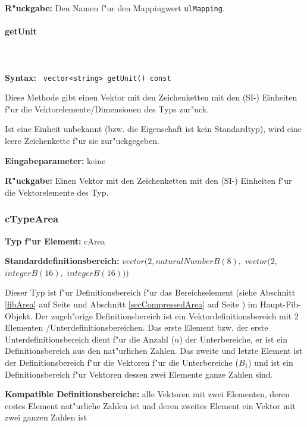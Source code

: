 \bigskip\noindent
\textbf{R"uckgabe:} Den Namen f"ur den Mappingwert \verb|ulMapping|.


\paragraph{getUnit}

\ \\\\\noindent
\textbf{Syntax:} \verb| vector<string> getUnit() const|

\bigskip\noindent
Diese Methode gibt einen Vektor mit den Zeichenketten mit den (SI-) Einheiten f"ur die Vektorelemente/Dimensionen des Typs zur"uck.

Ist eine Einheit unbekannt (bzw. die Eigenschaft ist kein Standardtyp), wird eine leere Zeichenkette f"ur sie zur"uckgegeben.

\bigskip\noindent
\textbf{Eingabeparameter:} keine

\bigskip\noindent
\textbf{R"uckgabe:} Einen Vektor mit den Zeichenketten mit den (SI-) Einheiten f"ur die Vektorelemente des Typ.



\subsubsection{cTypeArea}

\textbf{Typ f"ur Element:} cArea%

\bigskip\noindent
\textbf{Standarddefinitionsbereich:} $vector( 2, naturalNumberB(8),$ $vector( 2,$ $integerB(16),$ $integerB(16) ) )$


Dieser Typ ist f"ur Definitionsbereich f"ur das Bereichselement (siehe Abschnitt \ref{fibArea} auf Seite \pageref{fibArea} und Abschnitt \ref{secCompressedArea} auf Seite \pageref{secCompressedArea}) im Haupt-Fib-Objekt. Der zugeh"orige Definitionsbereich ist ein Vektordefinitionsbereich mit 2 Elementen /Unterdefinitionsbereichen. Das erste Element bzw. der erste Unterdefinitionsbereich dient f"ur die Anzahl ($n$) der Unterbereiche, er ist ein Definitionsbereich aus den nat"urlichen Zahlen. Das zweite und letzte Element ist der Definitionsbereich f"ur die Vektoren f"ur die Unterbereiche ($B_{1}$) und ist ein Definitionsbereich f"ur Vektoren dessen zwei Elemente ganze Zahlen sind. 

\bigskip\noindent
\textbf{Kompatible Definitionsbereiche:} alle Vektoren mit zwei Elementen, deren erstes Element nat"urliche Zahlen ist und deren zweites Element ein Vektor mit zwei ganzen Zahlen ist


